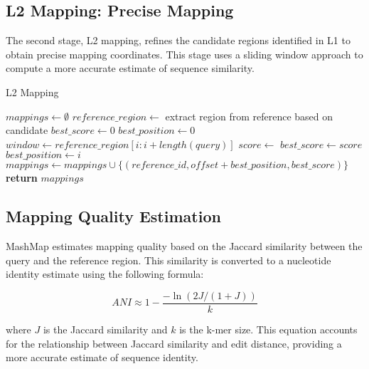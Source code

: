 \documentclass{article}
\begin{document}
\subsection{L2 Mapping: Precise Mapping}

The second stage, L2 mapping, refines the candidate regions identified in L1 to obtain precise mapping coordinates. This stage uses a sliding window approach to compute a more accurate estimate of sequence similarity.

\begin{algorithm}
\caption{L2 Mapping}
\begin{algorithmic}[1]
\State $mappings \gets \emptyset$
    \State $reference\_region \gets$ extract region from reference based on candidate
    \State $best\_score \gets 0$
    \State $best\_position \gets 0$
        \State $window \gets reference\_region[i:i+length(query)]$
        \State $score \gets$ 
            \State $best\_score \gets score$
            \State $best\_position \gets i$
        \EndIf
    \EndFor
        \State $mappings \gets mappings \cup \{(reference\_id, offset + best\_position, best\_score)\}$
    \EndIf
\EndFor
\State \textbf{return} $mappings$
\EndProcedure
\end{algorithmic}
\end{algorithm}

\subsection{Mapping Quality Estimation}

MashMap estimates mapping quality based on the Jaccard similarity between the query and the reference region. This similarity is converted to a nucleotide identity estimate using the following formula:

\begin{equation}
ANI \approx 1 - \frac{-\ln(2J/(1+J))}{k}
\end{equation}

where $J$ is the Jaccard similarity and $k$ is the k-mer size. This equation accounts for the relationship between Jaccard similarity and edit distance, providing a more accurate estimate of sequence identity.
\end{document}
